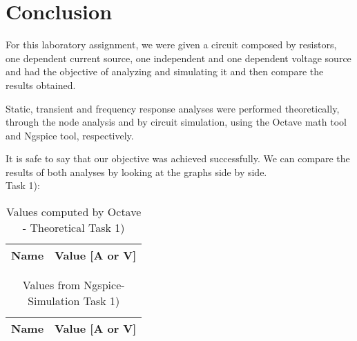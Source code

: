 
\section{Conclusion}
\label{sec:conclusion}


For this laboratory assignment, we were given a circuit composed by resistors, one dependent current source,
one independent and one dependent voltage source and had the objective of analyzing and simulating it and
then compare the results obtained.

Static, transient and frequency response analyses were performed theoretically, through the node analysis
and by circuit simulation, using the Octave math tool and Ngspice tool, respectively. 

It is safe to say that our objective was achieved successfully. We can compare the results of both
analyses by looking at the graphs side by side.  \\

Task 1):

\begin{table}[H]
	\centering
	\begin{tabular}{|l|r|}
    		\hline    
    		{\bf Name} & {\bf Value [A or V]} \\ \hline
    		
  	\end{tabular}
  	\caption{Values computed by Octave - Theoretical Task 1)}
 
\label{tab:node}
\end{table}

\begin{table}[H]
	\centering
	\begin{tabular}{|l|r|}
		\hline    
		{\bf Name} & {\bf Value [A or V]} \\ \hline
    		
	\end{tabular}
	
	\caption{Values from Ngspice- Simulation Task 1)}
    
\label{tab:op1}
\end{table}

